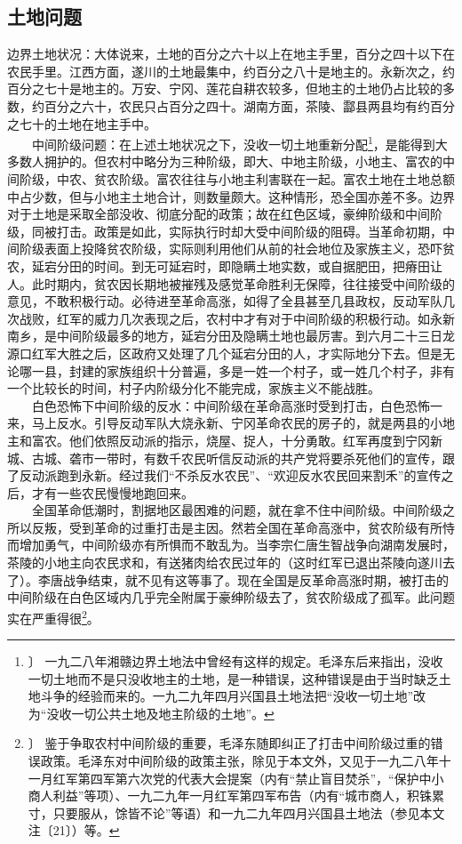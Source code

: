 \documentclass[cn,11pt,chinese]{elegantbook}
\def\myformat#1{\hfil\hfil #1}
\begin{document}
\subsection*{\myformat{土地问题}}
边界土地状况：大体说来，土地的百分之六十以上在地主手里，百分之四十以下在农民手里。江西方面，遂川的土地最集中，约百分之八十是地主的。永新次之，约百分之七十是地主的。万安、宁冈、莲花自耕农较多，但地主的土地仍占比较的多数，约百分之六十，农民只占百分之四十。湖南方面，茶陵、酃县两县均有约百分之七十的土地在地主手中。\\
　　中间阶级问题：在上述土地状况之下，没收一切土地重新分配\footnote[21]{〕 一九二八年湘赣边界土地法中曾经有这样的规定。毛泽东后来指出，没收一切土地而不是只没收地主的土地，是一种错误，这种错误是由于当时缺乏土地斗争的经验而来的。一九二九年四月兴国县土地法把“没收一切土地”改为“没收一切公共土地及地主阶级的土地”。}，是能得到大多数人拥护的。但农村中略分为三种阶级，即大、中地主阶级，小地主、富农的中间阶级，中农、贫农阶级。富农往往与小地主利害联在一起。富农土地在土地总额中占少数，但与小地主土地合计，则数量颇大。这种情形，恐全国亦差不多。边界对于土地是采取全部没收、彻底分配的政策；故在红色区域，豪绅阶级和中间阶级，同被打击。政策是如此，实际执行时却大受中间阶级的阻碍。当革命初期，中间阶级表面上投降贫农阶级，实际则利用他们从前的社会地位及家族主义，恐吓贫农，延宕分田的时间。到无可延宕时，即隐瞒土地实数，或自据肥田，把瘠田让人。此时期内，贫农因长期地被摧残及感觉革命胜利无保障，往往接受中间阶级的意见，不敢积极行动。必待进至革命高涨，如得了全县甚至几县政权，反动军队几次战败，红军的威力几次表现之后，农村中才有对于中间阶级的积极行动。如永新南乡，是中间阶级最多的地方，延宕分田及隐瞒土地也最厉害。到六月二十三日龙源口红军大胜之后，区政府又处理了几个延宕分田的人，才实际地分下去。但是无论哪一县，封建的家族组织十分普遍，多是一姓一个村子，或一姓几个村子，非有一个比较长的时间，村子内阶级分化不能完成，家族主义不能战胜。\\
　　白色恐怖下中间阶级的反水：中间阶级在革命高涨时受到打击，白色恐怖一来，马上反水。引导反动军队大烧永新、宁冈革命农民的房子的，就是两县的小地主和富农。他们依照反动派的指示，烧屋、捉人，十分勇敢。红军再度到宁冈新城、古城、砻市一带时，有数千农民听信反动派的共产党将要杀死他们的宣传，跟了反动派跑到永新。经过我们“不杀反水农民”、“欢迎反水农民回来割禾”的宣传之后，才有一些农民慢慢地跑回来。\\
　　全国革命低潮时，割据地区最困难的问题，就在拿不住中间阶级。中间阶级之所以反叛，受到革命的过重打击是主因。然若全国在革命高涨中，贫农阶级有所恃而增加勇气，中间阶级亦有所惧而不敢乱为。当李宗仁唐生智战争向湖南发展时，茶陵的小地主向农民求和，有送猪肉给农民过年的（这时红军已退出茶陵向遂川去了）。李唐战争结束，就不见有这等事了。现在全国是反革命高涨时期，被打击的中间阶级在白色区域内几乎完全附属于豪绅阶级去了，贫农阶级成了孤军。此问题实在严重得很\footnote[22]{〕 鉴于争取农村中间阶级的重要，毛泽东随即纠正了打击中间阶级过重的错误政策。毛泽东对中间阶级的政策主张，除见于本文外，又见于一九二八年十一月红军第四军第六次党的代表大会提案（内有“禁止盲目焚杀”，“保护中小商人利益”等项）、一九二九年一月红军第四军布告（内有“城市商人，积铢累寸，只要服从，馀皆不论”等语）和一九二九年四月兴国县土地法（参见本文注〔21〕）等。}。\\
\end{document}
